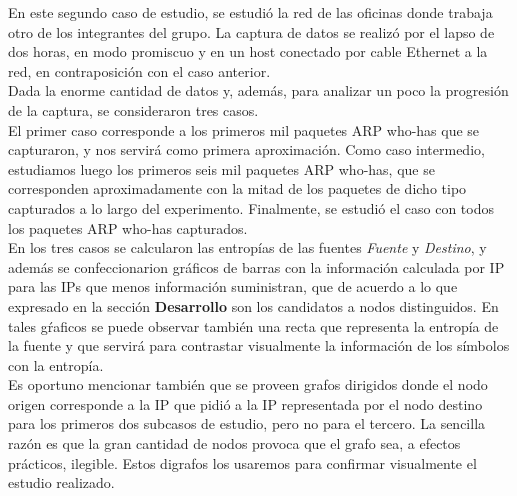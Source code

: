 \indent \indent  En este segundo caso de estudio, se estudió la red de las oficinas donde trabaja otro de los integrantes del grupo. La captura de datos se realizó por el lapso de dos horas, en modo promiscuo y en un host conectado por cable Ethernet a la red, en contraposición con el caso anterior.\\
\indent Dada la enorme cantidad de datos y, además, para analizar un poco la progresión de la captura, se consideraron tres casos.\\
\indent El primer caso corresponde a los primeros mil paquetes ARP who-has que se capturaron, y nos servirá como primera aproximación. Como caso intermedio, estudiamos luego los primeros seis mil paquetes ARP who-has, que se corresponden aproximadamente con la mitad de los paquetes de dicho tipo capturados a lo largo del experimento. Finalmente, se estudió el caso con todos los paquetes ARP who-has capturados.\\
\indent En los tres casos se calcularon las entropías de las fuentes \textit{Fuente} y \textit{Destino}, y además se confeccionarion gráficos de barras con la información calculada por IP para las IPs que menos información suministran, que de acuerdo a lo que expresado en la sección \textbf{Desarrollo} son los candidatos a  nodos distinguidos. En tales gŕaficos se puede observar también una recta que representa la entropía de la fuente y que servirá para contrastar visualmente la información de los símbolos con la entropía.\\
\indent Es oportuno mencionar también que se proveen grafos dirigidos donde el nodo origen corresponde a la IP que pidió a la IP representada por el nodo destino para los primeros dos subcasos de estudio, pero no para el tercero. La sencilla razón es que la gran cantidad de nodos provoca que el grafo sea, a efectos prácticos, ilegible. Estos digrafos los usaremos para confirmar visualmente el estudio realizado.\\

